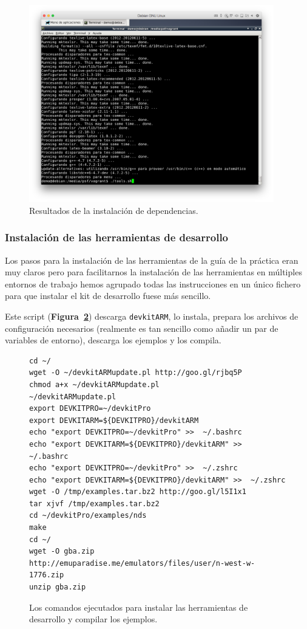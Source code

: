 \begin{figure}[h!]
	\caption{Resultados de la instalación de dependencias.}
	\label{fig:dependency}
	\centering
	\includegraphics[width=0.95\textwidth]{P1Media/Dependencias}
\end{figure}
	
	\subsubsection{Instalación de las herramientas de desarrollo}
	
	Los pasos para la instalación de las herramientas de la guía de la práctica eran muy claros pero para facilitarnos la instalación de las herramientas en múltiples entornos de trabajo hemos agrupado todas las instrucciones en un único fichero para que instalar el kit de desarrollo fuese más sencillo.
	
	Este script (\textbf{Figura~\ref{fig:installToolkit}}) descarga {\tt devkitARM}, lo instala, prepara los archivos de configuración necesarios (realmente es tan sencillo como añadir un par de variables de entorno), descarga los ejemplos y los compila.
	
\begin{figure}[ht]
\begin{mdframed}[style=exampledefault]
\begin{verbatim}
cd ~/
wget -O ~/devkitARMupdate.pl http://goo.gl/rjbq5P
chmod a+x ~/devkitARMupdate.pl
~/devkitARMupdate.pl
export DEVKITPRO=~/devkitPro
export DEVKITARM=${DEVKITPRO}/devkitARM
echo "export DEVKITPRO=~/devkitPro" >>  ~/.bashrc
echo "export DEVKITARM=${DEVKITPRO}/devkitARM" >>  ~/.bashrc
echo "export DEVKITPRO=~/devkitPro" >>  ~/.zshrc
echo "export DEVKITARM=${DEVKITPRO}/devkitARM" >>  ~/.zshrc
wget -O /tmp/examples.tar.bz2 http://goo.gl/l5I1x1
tar xjvf /tmp/examples.tar.bz2
cd ~/devkitPro/examples/nds
make
cd ~/
wget -O gba.zip http://emuparadise.me/emulators/files/user/n-west-w-1776.zip
unzip gba.zip
\end{verbatim}
\end{mdframed}

	\caption{Los comandos ejecutados para instalar las herramientas de desarrollo y compilar los ejemplos.}
	\label{fig:installToolkit}
\end{figure}

